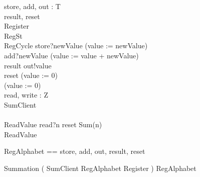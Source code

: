 \documentclass{llncs}
\begin{document}
\begin{circus}
\circchannel store, add, out : T\\
\circchannel result, reset\\
\circprocess Register \circdef\\
	\circbegin \circstate RegSt \\
	RegCycle \circdef store?newValue \then (value := newValue)\\
	\extchoice add?newValue \then (value := value + newValue)\\
	\extchoice result \then out!value \then \Skip\\
	\extchoice reset \then (value := 0)\\
	\circspot (value := 0) \circseq \Skip
	\circend\\

\circchannel read, write : Z\\
\circprocess SumClient \circdef\\
	\circbegin\\
	ReadValue \circdef read?n \then reset \then Sum(n)\\
	\circspot ReadValue\\
	\circend
\end{circus}
\begin{circus}
\circchannelset RegAlphabet == \lchanset store, add, out, result, reset \rchanset\\
\end{circus}
\begin{circus}
\circprocess Summation \circdef ( SumClient \lpar RegAlphabet \rpar Register ) \circhide RegAlphabet
\end{circus}
\end{document}
